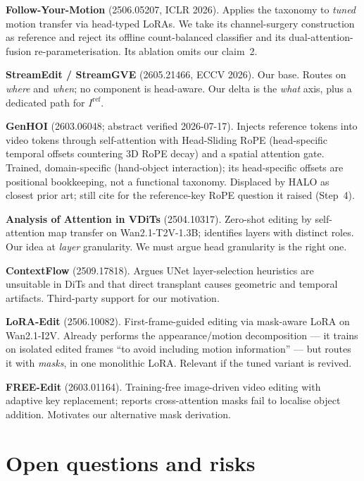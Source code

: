 \documentclass{article}
\begin{document}
\textbf{Follow-Your-Motion} (2506.05207, ICLR 2026). Applies the taxonomy to
\emph{tuned} motion transfer via head-typed LoRAs. We take its channel-surgery
construction as reference and reject its offline count-balanced classifier and
its dual-attention-fusion re-parameterisation. Its ablation omits our claim~2.

\textbf{StreamEdit / StreamGVE} (2605.21466, ECCV 2026). Our base. Routes on
\emph{where} and \emph{when}; no component is head-aware. Our delta is the
\emph{what} axis, plus a dedicated path for $I^{\mathrm{ref}}$.

\textbf{GenHOI} (2603.06048; abstract verified 2026-07-17). Injects reference
tokens into video tokens through self-attention with Head-Sliding RoPE
(head-specific temporal offsets countering 3D RoPE decay) and a spatial
attention gate. Trained, domain-specific (hand-object interaction); its
head-specific offsets are positional bookkeeping, not a functional taxonomy.
Displaced by HALO as closest prior art; still cite for the reference-key RoPE
question it raised (Step~4).

\textbf{Analysis of Attention in VDiTs} (2504.10317). Zero-shot editing by
self-attention map transfer on Wan2.1-T2V-1.3B; identifies layers with distinct
roles. Our idea at \emph{layer} granularity. We must argue head granularity is
the right one.

\textbf{ContextFlow} (2509.17818). Argues UNet layer-selection heuristics are
unsuitable in DiTs and that direct transplant causes geometric and temporal
artifacts. Third-party support for our motivation.

\textbf{LoRA-Edit} (2506.10082). First-frame-guided editing via mask-aware LoRA
on Wan2.1-I2V. Already performs the appearance/motion decomposition --- it trains
on isolated edited frames ``to avoid including motion information'' --- but
routes it with \emph{masks}, in one monolithic LoRA. Relevant if the tuned
variant is revived.

\textbf{FREE-Edit} (2603.01164). Training-free image-driven video editing with
adaptive key replacement; reports cross-attention masks fail to localise object
addition. Motivates our alternative mask derivation.

\section{Open questions and risks}
\end{document}
